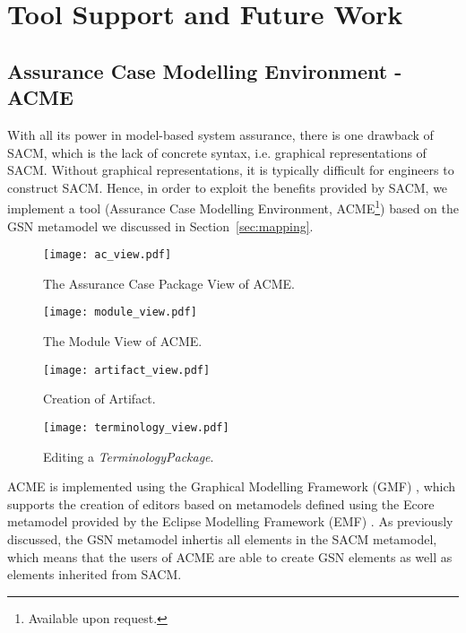 \section{Tool Support and Future Work}
\label{sec:toolsupport}
\subsection{Assurance Case Modelling Environment - ACME}
With all its power in model-based system assurance, there is one drawback of SACM, which is the lack of concrete syntax, i.e. graphical representations of SACM. 
Without graphical representations, it is typically difficult for engineers to construct SACM. 
Hence, in order to exploit the benefits provided by SACM, we implement a tool (Assurance Case Modelling Environment, ACME\footnote{Available upon request.}) based on the GSN metamodel we discussed in Section~\ref{sec:mapping}. 

\begin{figure}
	\centering
	\begin{minipage}[b]{0.49\textwidth}
		\texttt{[image: ac\_view.pdf]}
		\caption{The Assurance Case Package View of ACME.}
		\label{fig:ac_view}
	\end{minipage}
	\hfill
	\begin{minipage}[b]{0.49\textwidth}
		\texttt{[image: module\_view.pdf]}
		\caption{The Module View of ACME.}
		\label{fig:module_view}
	\end{minipage}
\end{figure}

\begin{figure}
	\centering
	\texttt{[image: artifact\_view.pdf]}
	\caption{Creation of Artifact.}
	\label{fig:artifact_view}
\end{figure}

\begin{figure}
	\centering
	\texttt{[image: terminology\_view.pdf]}
	\caption{Editing a \textit{TerminologyPackage}.}
	\label{fig:terminology_view}
\end{figure}

ACME is implemented using the Graphical Modelling Framework (GMF) \cite{gmf}, which supports the creation of editors based on metamodels defined using the Ecore metamodel provided by the Eclipse Modelling Framework (EMF) \cite{steinberg2008emf}. 
As previously discussed, the GSN metamodel inhertis all elements in the SACM metamodel, which means that the users of ACME are able to create GSN elements as well as elements inherited from SACM.

